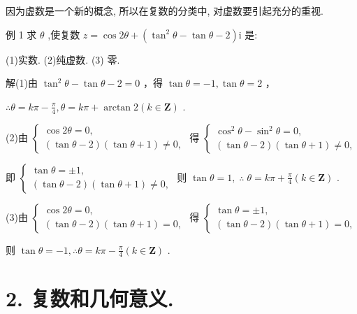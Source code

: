 \documentclass[10pt]{article}
\begin{document}
因为虚数是一个新的概念, 所以在复数的分类中, 对虚数要引起充分的重视.

例 1 求 \(\theta\) ,使复数 \(z = \cos {2\theta } + \left( {{\tan }^{2}\theta  - \tan \theta  - 2}\right) \mathrm{i}\) 是:

(1)实数. (2)纯虚数. (3) 零.

解(1)由 \({\tan }^{2}\theta  - \tan \theta  - 2 = 0\) ，得 \(\tan \theta  =  - 1,\tan \theta  = 2\) ，

\(\therefore \theta  = {k\pi } - \frac{\pi }{4},\theta  = {k\pi } + \arctan 2\left( {k \in  \mathbf{Z}}\right)\) .

(2)由 \(\left\{  \begin{array}{l} \cos {2\theta } = 0, \\  \left( {\tan \theta  - 2}\right) \left( {\tan \theta  + 1}\right)  \neq  0, \end{array}\right.\) 得 \(\left\{  \begin{array}{l} {\cos }^{2}\theta  - {\sin }^{2}\theta  = 0, \\  \left( {\tan \theta  - 2}\right) \left( {\tan \theta  + 1}\right)  \neq  0, \end{array}\right.\)

即 \(\left\{  \begin{array}{l} \tan \theta  =  \pm  1, \\  \left( {\tan \theta  - 2}\right) \left( {\tan \theta  + 1}\right)  \neq  0, \end{array}\right.\) 则 \(\tan \theta  = 1,\;\therefore \;\theta  = {k\pi } + \frac{\pi }{4}\left( {k \in  \mathbf{Z}}\right)\) .

(3)由 \(\left\{  \begin{array}{l} \cos {2\theta } = 0, \\  \left( {\tan \theta  - 2}\right) \left( {\tan \theta  + 1}\right)  = 0, \end{array}\right.\) 得 \(\left\{  \begin{array}{l} \tan \theta  =  \pm  1, \\  \left( {\tan \theta  - 2}\right) \left( {\tan \theta  + 1}\right)  = 0, \end{array}\right.\)

则 \(\tan \theta  =  - 1,\therefore \theta  = {k\pi } - \frac{\pi }{4}\left( {k \in  \mathbf{Z}}\right)\) .

\section*{2. 复数和几何意义.}
\end{document}
